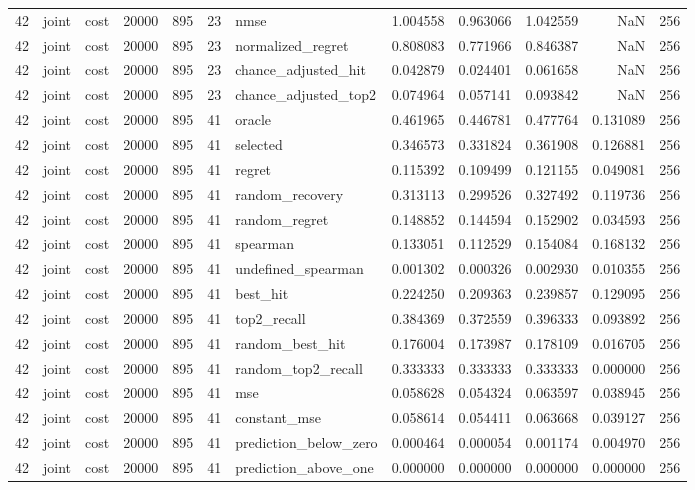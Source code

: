 \begin{tabular}{rllrrrlrrrrr}
42 & joint & cost & 20000 & 895 & 23 & nmse & 1.004558 & 0.963066 & 1.042559 & NaN & 256 \\
42 & joint & cost & 20000 & 895 & 23 & normalized_regret & 0.808083 & 0.771966 & 0.846387 & NaN & 256 \\
42 & joint & cost & 20000 & 895 & 23 & chance_adjusted_hit & 0.042879 & 0.024401 & 0.061658 & NaN & 256 \\
42 & joint & cost & 20000 & 895 & 23 & chance_adjusted_top2 & 0.074964 & 0.057141 & 0.093842 & NaN & 256 \\
42 & joint & cost & 20000 & 895 & 41 & oracle & 0.461965 & 0.446781 & 0.477764 & 0.131089 & 256 \\
42 & joint & cost & 20000 & 895 & 41 & selected & 0.346573 & 0.331824 & 0.361908 & 0.126881 & 256 \\
42 & joint & cost & 20000 & 895 & 41 & regret & 0.115392 & 0.109499 & 0.121155 & 0.049081 & 256 \\
42 & joint & cost & 20000 & 895 & 41 & random_recovery & 0.313113 & 0.299526 & 0.327492 & 0.119736 & 256 \\
42 & joint & cost & 20000 & 895 & 41 & random_regret & 0.148852 & 0.144594 & 0.152902 & 0.034593 & 256 \\
42 & joint & cost & 20000 & 895 & 41 & spearman & 0.133051 & 0.112529 & 0.154084 & 0.168132 & 256 \\
42 & joint & cost & 20000 & 895 & 41 & undefined_spearman & 0.001302 & 0.000326 & 0.002930 & 0.010355 & 256 \\
42 & joint & cost & 20000 & 895 & 41 & best_hit & 0.224250 & 0.209363 & 0.239857 & 0.129095 & 256 \\
42 & joint & cost & 20000 & 895 & 41 & top2_recall & 0.384369 & 0.372559 & 0.396333 & 0.093892 & 256 \\
42 & joint & cost & 20000 & 895 & 41 & random_best_hit & 0.176004 & 0.173987 & 0.178109 & 0.016705 & 256 \\
42 & joint & cost & 20000 & 895 & 41 & random_top2_recall & 0.333333 & 0.333333 & 0.333333 & 0.000000 & 256 \\
42 & joint & cost & 20000 & 895 & 41 & mse & 0.058628 & 0.054324 & 0.063597 & 0.038945 & 256 \\
42 & joint & cost & 20000 & 895 & 41 & constant_mse & 0.058614 & 0.054411 & 0.063668 & 0.039127 & 256 \\
42 & joint & cost & 20000 & 895 & 41 & prediction_below_zero & 0.000464 & 0.000054 & 0.001174 & 0.004970 & 256 \\
42 & joint & cost & 20000 & 895 & 41 & prediction_above_one & 0.000000 & 0.000000 & 0.000000 & 0.000000 & 256 \\

\end{tabular}
